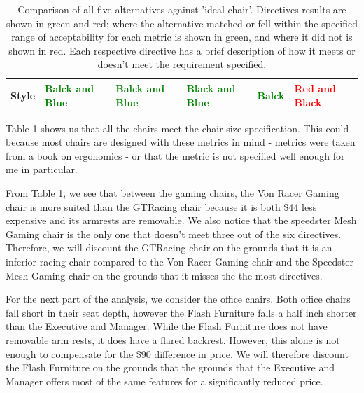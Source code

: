 \documentclass[11pt]{article}
\begin{document}
\begin{table}[H]
\begin{center}
\begin{tabular}{| p{1in} || p{1in} | p{1in} | p{1in} | p{1in} | p{1in} |}
            Style 
            &\textcolor{green}{Balck and Blue}
            &\textcolor{green}{Balck and Blue}
            &\textcolor{green}{Black and Blue}
            &\textcolor{green}{Balck}
            &\textcolor{red}{Red and Black}
            \\
            \hline
            \end{tabular}
        \end{center}
        \caption{Comparison of all five alternatives against 'ideal chair'. Directives results are shown in green and red; where the alternative matched or fell within the specified range of acceptability for each metric is shown in green, and where it did not is shown in red. Each respective directive has a brief description of how it meets or doesn't meet the requirement specified.}
        \label{fig:table1}
    \end{table}

    Table 1 shows us that all the chairs meet the chair size specification. This could because most chairs are designed with these metrics in mind - metrics were taken from a book on ergonomics \cite{seating-viewing-considerations} - or that the metric is not specified well enough for me in particular.

    From Table 1, we see that between the gaming chairs, the Von Racer Gaming chair is more suited than the GTRacing chair because it is both \$44 less expensive and its armrests are removable. We also notice that the speedster Mesh Gaming chair is the only one that doesn't meet three out of the six directives. Therefore, we will discount the GTRacing chair on the grounds that it is an inferior racing chair compared to the Von Racer Gaming chair and the Speedster Mesh Gaming chair on the grounds that it misses the the most directives.

    For the next part of the analysis, we consider the office chairs. Both office chairs fall short in their seat depth, however the Flash Furniture falls a half inch shorter than the Executive and Manager. While the Flash Furniture does not have removable arm rests, it does have a flared backrest. However, this alone is not enough to compensate for the \$90 difference in price. We will therefore discount the Flash Furniture on the grounds that the grounds that the Executive and Manager offers most of the same features for a significantly reduced price.
\end{document}
